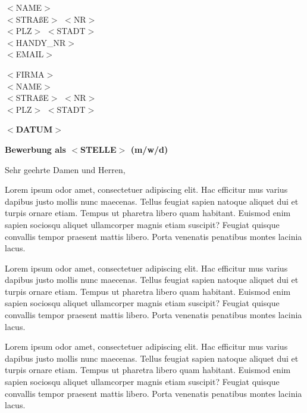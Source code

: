\documentclass[11pt,a4paper]{article}
\begin{document}
\begin{flushright}
    $<$NAME$>$ \\
    $<$STRAßE$>$ $<$NR$>$ \\
    $<$PLZ$>$ $<$STADT$>$ \\
    $<$HANDY\_NR$>$ \\
    $<$EMAIL$>$ \\
\end{flushright}

\vspace{1cm}

$<$FIRMA$>$ \\
$<$NAME$>$ \\
$<$STRAßE$>$ $<$NR$>$ \\
$<$PLZ$>$ $<$STADT$>$ \\

\vspace{1cm}

\textbf{$<$DATUM$>$} 

\vspace{1cm}

\textbf{Bewerbung als $<$STELLE$>$ (m/w/d)}

\vspace{0.5cm}

Sehr geehrte Damen und Herren,

Lorem ipsum odor amet, consectetuer adipiscing elit. Hac efficitur mus varius dapibus justo mollis nunc maecenas. 
Tellus feugiat sapien natoque aliquet dui et turpis ornare etiam. Tempus ut pharetra libero quam habitant. 
Euismod enim sapien sociosqu aliquet ullamcorper magnis etiam suscipit? Feugiat quisque convallis tempor praesent mattis libero. 
Porta venenatis penatibus montes lacinia lacus.

Lorem ipsum odor amet, consectetuer adipiscing elit. Hac efficitur mus varius dapibus justo mollis nunc maecenas. 
Tellus feugiat sapien natoque aliquet dui et turpis ornare etiam. Tempus ut pharetra libero quam habitant. 
Euismod enim sapien sociosqu aliquet ullamcorper magnis etiam suscipit? Feugiat quisque convallis tempor praesent mattis libero. 
Porta venenatis penatibus montes lacinia lacus.

Lorem ipsum odor amet, consectetuer adipiscing elit. Hac efficitur mus varius dapibus justo mollis nunc maecenas. 
Tellus feugiat sapien natoque aliquet dui et turpis ornare etiam. Tempus ut pharetra libero quam habitant. 
Euismod enim sapien sociosqu aliquet ullamcorper magnis etiam suscipit? Feugiat quisque convallis tempor praesent mattis libero. 
Porta venenatis penatibus montes lacinia lacus.
\end{document}
